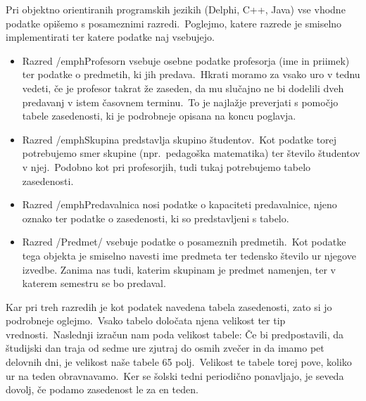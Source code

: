 \documentclass[a4paper,10pt]{article}
\begin{document}
\noindent Pri objektno orientiranih programskih jezikih (Delphi, C++, Java) vse vhodne podatke
opišemo s posameznimi razredi.\ Poglejmo, katere razrede je smiselno implementirati ter
katere podatke naj vsebujejo.



   \begin{itemize}
	\item Razred /emph{Profesorn} vsebuje osebne podatke profesorja (ime in priimek) ter
   podatke o predmetih, ki jih predava.\ Hkrati moramo za vsako uro v tednu vedeti, če
   je profesor takrat že zaseden, da mu slučajno ne bi dodelili dveh predavanj v istem
   časovnem terminu.\ To je najlažje preverjati s pomočjo tabele zasedenosti, ki je
   podrobneje opisana na koncu poglavja.

   \item Razred /emph{Skupina} predstavlja skupino študentov.\ Kot podatke torej potrebujemo
   smer skupine (npr.\ pedagoška matematika) ter število študentov v njej.\ Podobno kot pri
   profesorjih, tudi tukaj potrebujemo tabelo zasedenosti.

   \item Razred /emph{Predavalnica} nosi podatke o kapaciteti predavalnice, njeno oznako
   ter podatke o zasedenosti, ki so predstavljeni s tabelo.

   \item Razred /Predmet/ vsebuje podatke o posameznih predmetih.\ Kot podatke tega
   objekta je smiselno navesti ime predmeta ter tedensko število ur njegove izvedbe.
   Zanima nas tudi, katerim skupinam je predmet namenjen, ter v katerem semestru se bo
   predaval.
\end{itemize}

Kar pri treh razredih je kot podatek navedena tabela zasedenosti, zato si jo podrobneje
oglejmo.\ Vsako tabelo določata njena velikost ter tip vrednosti.\ Naslednji izračun nam
poda velikost tabele:
%
Če bi predpostavili, da študijski dan traja od sedme ure zjutraj do osmih zvečer in da
imamo pet delovnih dni, je velikost naše tabele 65 polj.\ Velikost te tabele torej pove,
koliko ur na teden obravnavamo.\ Ker se šolski tedni periodično ponavljajo, je seveda
dovolj, če podamo zasedenost le za en teden.
\end{document}
